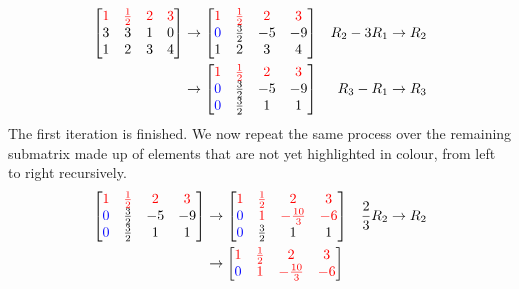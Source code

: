 \begin{solution}
\begin{align*}
\begin{bmatrix}
\textcolor{red}{1} & \textcolor{red}{\frac{1}{2}} & \textcolor{red}{2} & \textcolor{red}{3} \\
3 & 3 & 1 & 0 \\
1 & 2 & 3 & 4
\end{bmatrix}
&\to
\begin{bmatrix}
\textcolor{red}{1} & \textcolor{red}{\frac{1}{2}} & \textcolor{red}{2} & \textcolor{red}{3} \\
\textcolor{blue}{0} & \frac{3}{2} & -5 & -9 \\
1 & 2 & 3 & 4
\end{bmatrix}
& R_2-3R_1 \to R_2 \\
&\to
\begin{bmatrix}
\textcolor{red}{1} & \textcolor{red}{\frac{1}{2}} & \textcolor{red}{2} & \textcolor{red}{3} \\
\textcolor{blue}{0} & \frac{3}{2} & -5 & -9 \\
\textcolor{blue}{0} & \frac{3}{2} & 1 & 1
\end{bmatrix}
& R_3-R_1 \to R_3
\end{align*}
The first iteration is finished. We now repeat the same process over the remaining submatrix made up of elements that are not yet highlighted in colour, from left to right recursively.
\begin{align*}
\begin{bmatrix}
\textcolor{red}{1} & \textcolor{red}{\frac{1}{2}} & \textcolor{red}{2} & \textcolor{red}{3} \\
\textcolor{blue}{0} & \frac{3}{2} & -5 & -9 \\
\textcolor{blue}{0} & \frac{3}{2} & 1 & 1
\end{bmatrix}
&\to
\begin{bmatrix}
\textcolor{red}{1} & \textcolor{red}{\frac{1}{2}} & \textcolor{red}{2} & \textcolor{red}{3} \\
\textcolor{blue}{0} & \textcolor{red}{1} & \textcolor{red}{-\frac{10}{3}} & \textcolor{red}{-6} \\
\textcolor{blue}{0} & \frac{3}{2} & 1 & 1
\end{bmatrix}
& \frac{2}{3}R_2 \to R_2 \\
&\to
\begin{bmatrix}
\textcolor{red}{1} & \textcolor{red}{\frac{1}{2}} & \textcolor{red}{2} & \textcolor{red}{3} \\
\textcolor{blue}{0} & \textcolor{red}{1} & \textcolor{red}{-\frac{10}{3}} & \textcolor{red}{-6} \\

\end{bmatrix}
\end{align*}
\end{solution}
